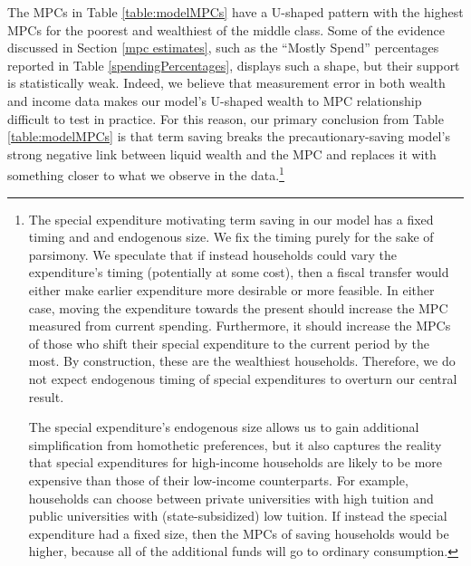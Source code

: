 \documentclass[fleqccn,12pt]{article}
\begin{document}
The MPCs in Table \ref{table:modelMPCs} have a U-shaped pattern with the highest MPCs for the poorest and wealthiest of the middle class. Some of the evidence discussed in Section \ref{mpc estimates}, such as the ``Mostly Spend'' percentages reported in Table \ref{spendingPercentages}, displays such a shape, but their support is statistically weak. Indeed, we believe that measurement error in both wealth and income data makes our model's U-shaped wealth to MPC relationship difficult to test in practice. For this reason, our primary conclusion from Table \ref{table:modelMPCs} is that term saving breaks the precautionary-saving model's strong negative link between liquid wealth and the MPC and replaces it with something closer to what we observe in the data.\footnote{The special expenditure motivating term saving in our model has a fixed timing and and endogenous size. We fix the timing purely for the sake of parsimony. We speculate that if instead households could vary the expenditure's timing (potentially at some cost), then a fiscal transfer would either make earlier expenditure more desirable or more feasible. In either case, moving the expenditure towards the present should increase the MPC measured from current spending. Furthermore, it should increase the MPCs of those who shift their special expenditure to the current period by the most. By construction, these are the wealthiest households. Therefore, we do not expect endogenous timing of special expenditures to overturn our central result.

The special expenditure's endogenous size allows us to gain additional simplification from homothetic preferences, but it also captures the reality that special expenditures for high-income households are likely to be more expensive than those of their low-income counterparts. For example, households can choose between private universities with high tuition and public universities with (state-subsidized) low tuition.  If instead the special expenditure had a fixed size, then the MPCs of saving households would be higher, because all of the additional funds will go to ordinary consumption. 
}
\end{document}

